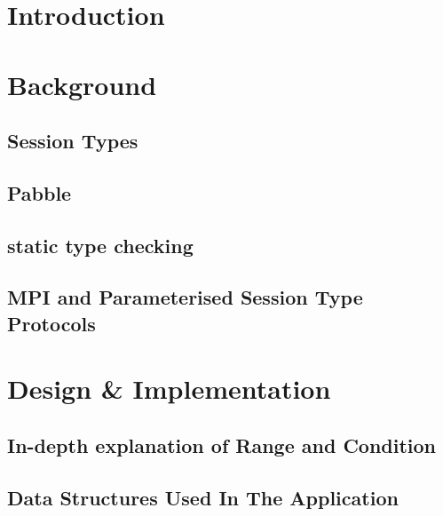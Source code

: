 \documentclass[twoside]{icldt}
\begin{document}
\tableofcontents

\listoffigures

\listoftables

\chapter{Introduction}






\chapter{Background}
\section{Session Types}







\section{Pabble}




\section{static type checking}





\section{MPI and Parameterised Session Type Protocols}



\chapter{Design \& Implementation}








\newpage
\section{In-depth explanation of Range and Condition}

\newpage
\section{Data Structures Used In The Application}




\end{document}
